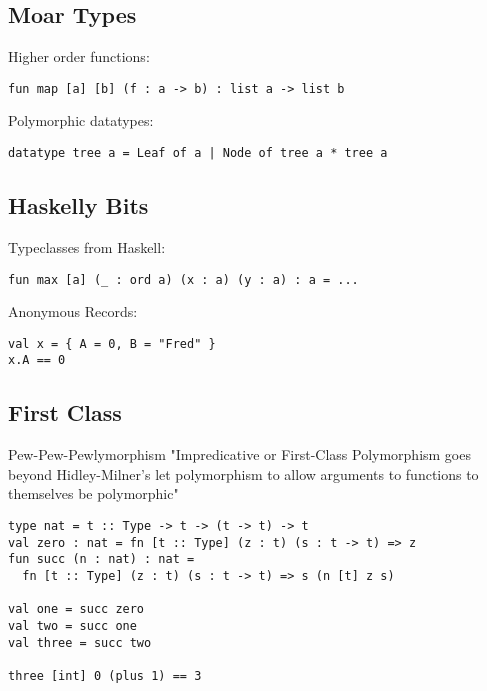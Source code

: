 \documentclass{beamer}
\begin{document}
\subsection{Moar Types}
\begin{frame}[fragile]
Higher order functions:
\begin{verbatim}
fun map [a] [b] (f : a -> b) : list a -> list b
\end{verbatim}
Polymorphic datatypes:
\begin{verbatim}
datatype tree a = Leaf of a | Node of tree a * tree a
\end{verbatim}
\end{frame}

\subsection{Haskelly Bits}
\begin{frame}[fragile]
Typeclasses from Haskell:
\begin{verbatim}
fun max [a] (_ : ord a) (x : a) (y : a) : a = ...
\end{verbatim}
Anonymous Records:
\begin{verbatim}
val x = { A = 0, B = "Fred" }
x.A == 0
\end{verbatim}
\end{frame}

\subsection{First Class}
\begin{frame}[fragile]{Pew-Pew-Pewlymorphism}
"Impredicative or First-Class Polymorphism goes beyond Hidley-Milner's let polymorphism to allow arguments to functions to themselves be polymorphic"
\begin{verbatim}
type nat = t :: Type -> t -> (t -> t) -> t
val zero : nat = fn [t :: Type] (z : t) (s : t -> t) => z
fun succ (n : nat) : nat = 
  fn [t :: Type] (z : t) (s : t -> t) => s (n [t] z s)

val one = succ zero
val two = succ one
val three = succ two

three [int] 0 (plus 1) == 3
\end{verbatim}
\end{frame}
\end{document}
